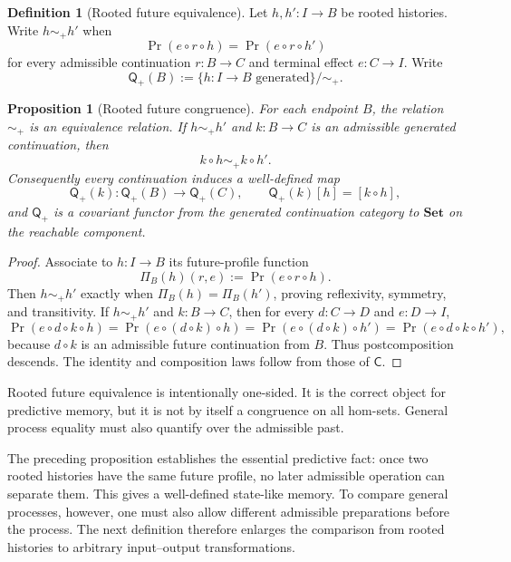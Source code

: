 \documentclass[11pt]{article}
\newtheorem{proposition}[theorem]{Proposition}
\theoremstyle{definition}
\newtheorem{definition}[theorem]{Definition}
\theoremstyle{remark}
\newcommand{\Qq}{\mathsf Q}
\begin{document}
\begin{definition}[Rooted future equivalence]
\label{def:future-equivalence}
Let $h,h':I\to B$ be rooted histories.  Write $h\sim_+h'$ when
\[
 \Pr(e\circ r\circ h)=\Pr(e\circ r\circ h')
\]
for every admissible continuation $r:B\to C$ and terminal effect $e:C\to I$.
Write
\[
 \Qq_+(B):=\{h:I\to B\text{ generated}\}/\!\sim_+.
\]
\end{definition}

\begin{proposition}[Rooted future congruence]
\label{prop:largest-congruence}
For each endpoint $B$, the relation $\sim_+$ is an equivalence relation.  If
$h\sim_+h'$ and $k:B\to C$ is an admissible generated continuation, then
\[
 k\circ h\sim_+k\circ h'.
\]
Consequently every continuation induces a well-defined map
\[
 \Qq_+(k):\Qq_+(B)\longrightarrow\Qq_+(C),\qquad
 \Qq_+(k)[h]=[k\circ h],
\]
and $\Qq_+$ is a covariant functor from the generated continuation category to
$\mathbf{Set}$ on the reachable component.
\end{proposition}

\begin{proof}
Associate to $h:I\to B$ its future-profile function
\[
 \Pi_B(h)(r,e):=\Pr(e\circ r\circ h).
\]
Then $h\sim_+h'$ exactly when $\Pi_B(h)=\Pi_B(h')$, proving reflexivity,
symmetry, and transitivity.  If $h\sim_+h'$ and $k:B\to C$, then for every
$d:C\to D$ and $e:D\to I$,
\[
 \Pr(e\circ d\circ k\circ h)
 =\Pr(e\circ(d\circ k)\circ h)
 =\Pr(e\circ(d\circ k)\circ h')
 =\Pr(e\circ d\circ k\circ h'),
\]
because $d\circ k$ is an admissible future continuation from $B$.  Thus
postcomposition descends.  The identity and composition laws follow from those
of $\mathsf C$.
\end{proof}

Rooted future equivalence is intentionally one-sided.  It is the correct object
for predictive memory, but it is not by itself a congruence on all hom-sets.
General process equality must also quantify over the admissible past.

The preceding proposition establishes the essential predictive fact: once two
rooted histories have the same future profile, no later admissible operation can
separate them.  This gives a well-defined state-like memory.  To compare general
processes, however, one must also allow different admissible preparations before
the process.  The next definition therefore enlarges the comparison from rooted
histories to arbitrary input--output transformations.
\end{document}
